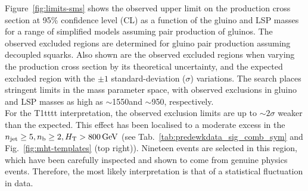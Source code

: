 Figure~\ref{fig:limits-sms} shows the observed upper limit on the
production cross section at 95\% confidence level (CL) as a function
of the gluino and LSP masses for a range of simplified models assuming
pair production of gluinos. The observed excluded regions are
determined for gluino pair production assuming decoupled squarks. Also
shown are the observed excluded regions when varying the production
cross section by its theoretical uncertainty, and the expected
excluded region with the ${\pm}1$ standard-deviation ($\sigma$)
variations. The search places stringent limits in the mass parameter
space, with observed exclusions in gluino and LSP masses as high as
$\sim$1550\gev and $\sim$950\gev, respectively. \\
For the T1tttt interpretation, the observed exclusion limits are up to $\sim 2\sigma$ weaker 
than the expected. This effect has been localised to a moderate 
excess in the $n_{\text{jet}}\geq5, n_{\text{b}}\geq2, H_{\mathrm{T}} > 800 \, \mathrm{GeV}$ 
(see Tab.~\ref{tab:predewkdata_sig_comb_sym} and Fig.~\ref{fig:mht-templates} (top right)). 
Nineteen events are selected in this region, which have been 
carefully inspected and shown to come from genuine physics events. 
Therefore, the most likely interpretation is that of a statistical fluctuation in data. 


